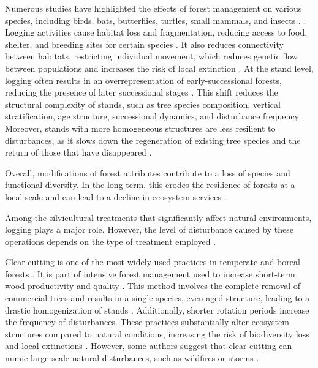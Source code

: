 Numerous studies have highlighted the effects of forest management on various species, including birds, bats, butterflies, turtles, small mammals, and insects \citep{Summerville2011Managingforest,Currylow2012ShortTermForest,Kaminski2013EffectsForest,Kellner2013Shorttermresponses,Caldwell2019ComparisonBat}. .
Logging activities cause habitat loss and fragmentation, reducing access to food, shelter, and breeding sites for certain species \citep{Bouderbala2023Longtermeffect}. 
It also reduces connectivity between habitats, restricting individual movement, which reduces genetic flow between populations and increases the risk of local extinction \citep{Saccheri1998Inbreedingextinction}. 
At the stand level, logging often results in an overrepresentation of early-successional forests, reducing the presence of later successional stages \citep{Cyr2009Forestmanagement,Boucher2017Cumulativepatterns}. 
This shift reduces the structural complexity of stands, such as tree species composition, vertical stratification, age structure, successional dynamics, and disturbance frequency \citep{Commarmot2005Structurevirgin}. 
Moreover, stands with more homogeneous structures are less resilient to disturbances, as it slows down the regeneration of existing tree species and the return of those that have disappeared \citep{Kuuluvainen2009Forestmanagement}. 

Overall, modifications of forest attributes contribute to a loss of species and functional diversity. 
In the long term, this erodes the resilience of forests at a local scale and can lead to a decline in ecosystem services \citep{Hooper2012globalsynthesis,Edwards2014Maintainingecosystem}.

%

Among the silvicultural treatments that significantly affect natural environments, logging plays a major role. 
However, the level of disturbance caused by these operations depends on the type of treatment employed \citep{Ameray2021Forestcarbon}. 

Clear-cutting is one of the most widely used practices in temperate and boreal forests \citep{Fedrowitz2014Canretention,Chaudhary2016Impactforest}. 
It is part of intensive forest management used to increase short-term wood productivity and quality \citep{Irland2011TimberProductivitya}.
This method involves the complete removal of commercial trees and results in a single-species, even-aged structure, leading to a drastic homogenization of stands \citep{Rosenvald2008whatwhen}. 
Additionally, shorter rotation periods increase the frequency of disturbances. 
These practices substantially alter ecosystem structures compared to natural conditions, increasing the risk of biodiversity loss and local extinctions \citep{Hanski2000Extinctiondebt}. 
However, some authors suggest that clear-cutting can mimic large-scale natural disturbances, such as wildfires or storms \citep{Greenberg1995comparisonbird}. 

